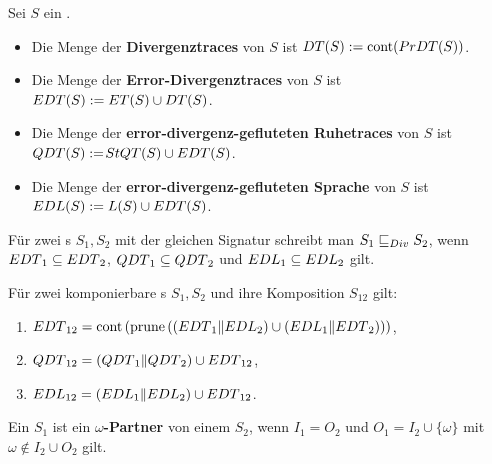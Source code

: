 \begin{frame}
  \begin{Def}
    Sei $S$ ein \EIO{}.
    \begin{itemize}
      \item Die Menge der \textbf{Divergenztraces} von $S$ ist $DT{}(S) :=
        \mathrm{cont}{}(PrDT{}(S))$.
      \item Die Menge der \textbf{Error-Divergenztraces} von $S$ ist $EDT{}(S) :=
        ET{}(S)\cup DT{}(S)$.
      \item Die Menge der \textbf{error-divergenz-gefluteten Ruhetraces} von $S$
        ist $QDT{}(S) :=$\linebreak $StQT{}(S)\cup EDT{}(S)$.
      \item Die Menge der \textbf{error-divergenz-gefluteten Sprache} von $S$ ist
        $EDL{}(S) := L(S) \cup EDT{}(S)$.
    \end{itemize}
    Für zwei \EIO{}s $S_1, S_2$ mit der gleichen Signatur schreibt man $S_1\sqsubseteq _{Div}
    S_2$, wenn $EDT{}_1\subseteq EDT{}_2$, $QDT{}_1\subseteq QDT{}_2$ und
    $EDL{}_1\subseteq EDL{}_2$ gilt.
  \end{Def}
\end{frame}

\begin{frame}
  \begin{satz}
    Für zwei komponierbare \EIO{}s $S_1, S_2$ und ihre Komposition
    $S_{12}$ gilt:
    \begin{enumerate}
      \item $EDT{}_{12}=\mathrm{cont} \left(\mathrm{prune} \left(\left(EDT{}_1\|EDL{}_2\right)\cup
        \left(EDL{}_1\|EDT{}_2\right)\right)\right)$,
      \item $QDT{}_{12}=(QDT{}_1\|QDT{}_2)\cup EDT{}_{12}$,
      \item $EDL{}_{12}=(EDL{}_1\|EDL{}_2)\cup EDT{}_{12}$.
    \end{enumerate}
  \end{satz}
\end{frame}

\begin{frame}
  \begin{Def}
    Ein \EIO{} $S_1$ ist ein \textbf{\boldmath$\omega$-Partner} von einem \EIO{} $S_2$, wenn
    $I_1=O_2$ und $O_1=I_2\cup\{\omega\}$ mit $\omega\notin I_2\cup O_2$ gilt.
  \end{Def}
\end{frame}

